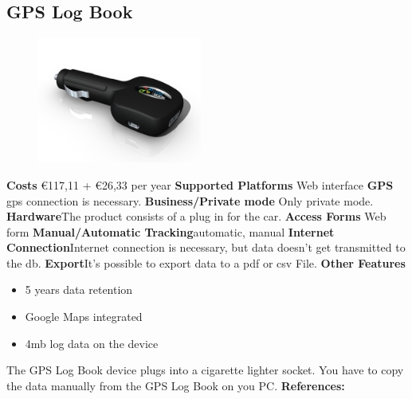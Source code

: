 \begin{singlespace}
\section{GPS Log Book}
\begin{figure}
  \begin{center}
    \includegraphics[width=0.48\textwidth]{bilder/GPSlogbook2}
  \end{center}
\end{figure}
\textbf{Costs} \euro 117,11 + \euro 26,33 per year
\newline\newline
\textbf{Supported Platforms} Web interface
\newline\newline
\textbf{GPS} \gls{gps} connection is necessary.
\newline\newline
\textbf{Business/Private mode} Only private mode.
\newline\newline
\textbf{Hardware}The product consists of a plug in for the car.
\newline\newline
\textbf{Access Forms} Web form
\newline\newline
\textbf{Manual/Automatic Tracking}automatic, manual
\newline\newline
\textbf{Internet Connection}Internet connection is necessary, but data doesn't get transmitted to the \gls{db}.
\newline\newline
\textbf{Export}It's possible to export data to a \gls{pdf} or \gls{csv} File.
\newline\newline
\textbf{Other Features}
\begin{itemize}
\item 5 years data retention 
\item Google Maps integrated
\item 4\gls{mb} log data on the device
\end{itemize}
The GPS Log Book device plugs into a cigarette lighter socket. You have to copy the data manually from the GPS Log Book on you PC.
\newline\newline
\textbf{References:} \cite{GPS_Log_Book}
\newpage


\end{singlespace}
